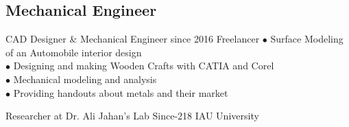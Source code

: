 \documentclass[
	a4paper,
]{ThirtyNinesecondscv}
\begin{document}
\subsection{Mechanical Engineer}
\begin{cvtable}[1.5]
	\customcvitem
                    {\faBriefcase}
                    {CAD Designer \& Mechanical Engineer}
                    {since 2016}
                    {Freelancer}
                    {
                    $\bullet$ Surface Modeling of an Automobile interior design  ~~ \\ $\bullet$ Designing and making Wooden Crafts with CATIA and Corel ~~\\
                    $\bullet$ Mechanical modeling and analysis ~~\\
                    $\bullet$ Providing handouts about metals and their market 
                    }

        \customcvitem
                    {\faBriefcase}
                    {Researcher at Dr. Ali Jahan's Lab}
                    {Since-218}
                    {IAU University}
                    {}


\end{cvtable}



\begin{cvtable}
\end{cvtable}

\end{document}
